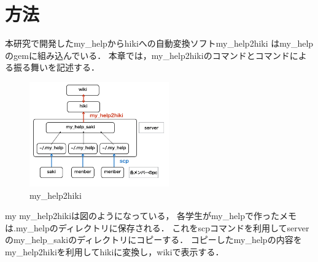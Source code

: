 \section{方法}
本研究で開発したmy\_helpからhikiへの自動変換ソフトmy\_help2hiki
はmy\_helpのgemに組み込んでいる．
本章では，my\_help2hikiのコマンドとコマンドによる振る舞いを記述する．

\begin{figure}[htbp]\begin{center}
\includegraphics[width=6cm,bb=100 100 600 700]{my_help2hiki_saki.010.png}
\caption{my\_help2hiki}
\label{default}\end{center}\end{figure}

\begin{description}
\item my
my\_help2hikiは図のようになっている，
各学生がmy\_helpで作ったメモは.my\_helpのディレクトリに保存される．
これをscpコマンドを利用してserverのmy\_help\_sakiのディレクトリにコピーする．
コピーしたmy\_helpの内容をmy\_help2hikiを利用してhikiに変換し，wikiで表示する．
\end{description}

